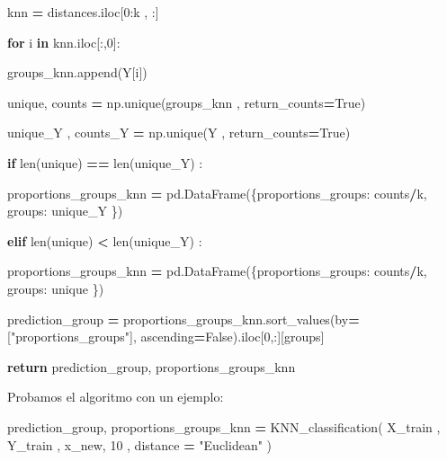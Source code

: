 \documentclass[
  11pt,
  a4paper,
]{article}
\newenvironment{Shaded}{\begin{snugshade}}{\end{snugshade}}
\newcommand{\BuiltInTok}[1]{#1}
\newcommand{\ControlFlowTok}[1]{\textcolor[rgb]{0.13,0.29,0.53}{\textbf{#1}}}
\newcommand{\DecValTok}[1]{\textcolor[rgb]{0.00,0.00,0.81}{#1}}
\newcommand{\KeywordTok}[1]{\textcolor[rgb]{0.13,0.29,0.53}{\textbf{#1}}}
\newcommand{\NormalTok}[1]{#1}
\newcommand{\OperatorTok}[1]{\textcolor[rgb]{0.81,0.36,0.00}{\textbf{#1}}}
\newcommand{\StringTok}[1]{\textcolor[rgb]{0.31,0.60,0.02}{#1}}
\newcommand{\VariableTok}[1]{\textcolor[rgb]{0.00,0.00,0.00}{#1}}
\begin{document}
\begin{Shaded}
\begin{Highlighting}[]
\NormalTok{    knn }\OperatorTok{=}\NormalTok{ distances.iloc[}\DecValTok{0}\NormalTok{:k , :]}

    \ControlFlowTok{for}\NormalTok{ i }\KeywordTok{in}\NormalTok{ knn.iloc[:,}\DecValTok{0}\NormalTok{]:}

\NormalTok{        groups\_knn.append(Y[i])}

\NormalTok{    unique, counts }\OperatorTok{=}\NormalTok{ np.unique(groups\_knn , return\_counts}\OperatorTok{=}\VariableTok{True}\NormalTok{)}

\NormalTok{    unique\_Y , counts\_Y }\OperatorTok{=}\NormalTok{ np.unique(Y , return\_counts}\OperatorTok{=}\VariableTok{True}\NormalTok{)}

    \ControlFlowTok{if} \BuiltInTok{len}\NormalTok{(unique) }\OperatorTok{==} \BuiltInTok{len}\NormalTok{(unique\_Y) :}

\NormalTok{        proportions\_groups\_knn }\OperatorTok{=}\NormalTok{ pd.DataFrame(\{}\StringTok{\textquotesingle{}proportions\_groups\textquotesingle{}}\NormalTok{: counts}\OperatorTok{/}\NormalTok{k, }\StringTok{\textquotesingle{}groups\textquotesingle{}}\NormalTok{: unique\_Y \})}
    
    \ControlFlowTok{elif} \BuiltInTok{len}\NormalTok{(unique) }\OperatorTok{\textless{}} \BuiltInTok{len}\NormalTok{(unique\_Y) :}

\NormalTok{        proportions\_groups\_knn }\OperatorTok{=}\NormalTok{ pd.DataFrame(\{}\StringTok{\textquotesingle{}proportions\_groups\textquotesingle{}}\NormalTok{: counts}\OperatorTok{/}\NormalTok{k, }\StringTok{\textquotesingle{}groups\textquotesingle{}}\NormalTok{: unique \})}



\NormalTok{    prediction\_group }\OperatorTok{=}\NormalTok{ proportions\_groups\_knn.sort\_values(by}\OperatorTok{=}\NormalTok{[}\StringTok{"proportions\_groups"}\NormalTok{], ascending}\OperatorTok{=}\VariableTok{False}\NormalTok{).iloc[}\DecValTok{0}\NormalTok{,:][}\StringTok{\textquotesingle{}groups\textquotesingle{}}\NormalTok{]}
                                      

    \ControlFlowTok{return}\NormalTok{ prediction\_group, proportions\_groups\_knn   }
\end{Highlighting}
\end{Shaded}

\newpage

Probamos el algoritmo con un ejemplo:

\begin{Shaded}
\begin{Highlighting}[]
\NormalTok{prediction\_group, proportions\_groups\_knn  }\OperatorTok{=}\NormalTok{ KNN\_classification( X\_train , Y\_train , x\_new, }\DecValTok{10}\NormalTok{ , distance }\OperatorTok{=} \StringTok{"Euclidean"}\NormalTok{ )}
\end{Highlighting}
\end{Shaded}
\end{document}

